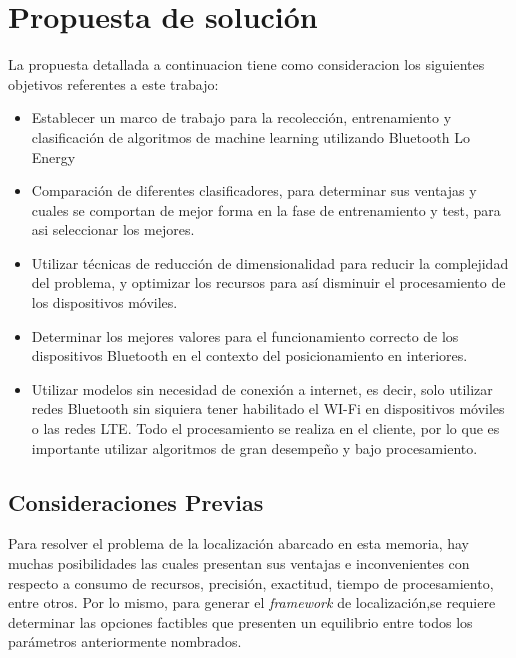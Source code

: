 \chapter{Propuesta de solución}

La propuesta detallada a continuacion tiene como consideracion los siguientes objetivos referentes a este trabajo:

\begin{itemize}
\item Establecer un marco de trabajo para la recolección, entrenamiento y clasificación de algoritmos de machine learning utilizando Bluetooth Lo Energy

\item Comparación de diferentes clasificadores, para determinar sus ventajas y cuales se comportan de mejor forma en la fase de entrenamiento y test, para asi seleccionar los mejores.

\item Utilizar técnicas de reducción de dimensionalidad para reducir la complejidad del problema, y optimizar los recursos para así disminuir el procesamiento de los dispositivos móviles.

\item Determinar los mejores valores para el funcionamiento correcto de los dispositivos Bluetooth en el contexto del posicionamiento en interiores.

\item Utilizar modelos sin necesidad de conexión a internet, es decir, solo utilizar redes Bluetooth sin siquiera tener habilitado el WI-Fi en dispositivos móviles o las redes LTE. Todo el procesamiento se realiza en el cliente, por lo que es importante utilizar algoritmos de gran desempeño y bajo procesamiento.
\end{itemize}


\section{Consideraciones Previas}

Para resolver el problema de la localización abarcado en esta memoria, hay muchas posibilidades las cuales presentan sus ventajas e inconvenientes con respecto a consumo de recursos, precisión, exactitud, tiempo de procesamiento, entre otros. Por lo mismo, para generar el \textit{framework} de localización,se requiere determinar las opciones factibles que presenten un equilibrio entre todos los parámetros anteriormente nombrados.

